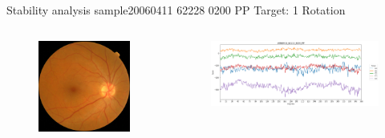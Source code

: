 \documentclass{beamer}
\begin{document}
\begin{frame}{Stability analysis sample}{20060411 62228 0200 PP Target: 1 Rotation}
\begin{columns}
	\begin{column}{0.3\textwidth}
		\begin{figure}[p]
			\centering
			\includegraphics[width=\textwidth]{chapter_stability/20060411_62228_0200_PP/20060411_62228_0200_PP.jpeg}
		\end{figure}	
	\end{column}
	\begin{column}{0.45\textwidth}  %
		\begin{figure}[p]
			\centering
			\includegraphics[width=\textwidth]{chapter_stability/20060411_62228_0200_PP/r/scores.png}
		\end{figure}
		\centering
		\href{run:videos_stability/Messidor_20060411_62228_0200_PP_Target_1_Checking_Rotation_Sensitivity.mp4}{\color{blue}{Rotation Visualization}} 
	\end{column}
\end{columns}
\end{frame}
\end{document}

